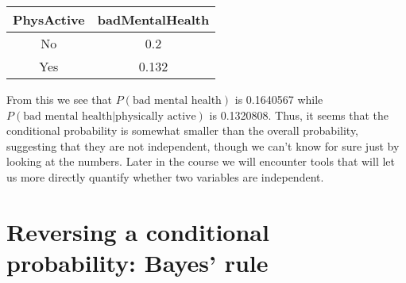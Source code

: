 \documentclass[]{book}
\theoremstyle{definition}
\theoremstyle{definition}
\theoremstyle{definition}
\theoremstyle{remark}
\begin{document}
\begin{longtable}[]{@{}cc@{}}
\toprule
\begin{minipage}[b]{0.17\columnwidth}\centering\strut
PhysActive\strut
\end{minipage} & \begin{minipage}[b]{0.22\columnwidth}\centering\strut
badMentalHealth\strut
\end{minipage}\tabularnewline
\midrule
\endhead
\begin{minipage}[t]{0.17\columnwidth}\centering\strut
No\strut
\end{minipage} & \begin{minipage}[t]{0.22\columnwidth}\centering\strut
0.2\strut
\end{minipage}\tabularnewline
\begin{minipage}[t]{0.17\columnwidth}\centering\strut
Yes\strut
\end{minipage} & \begin{minipage}[t]{0.22\columnwidth}\centering\strut
0.132\strut
\end{minipage}\tabularnewline
\bottomrule
\end{longtable}

From this we see that \(P(\text{bad mental health})\) is 0.1640567 while
\(P(\text{bad mental health|physically active})\) is 0.1320808. Thus, it
seems that the conditional probability is somewhat smaller than the
overall probability, suggesting that they are not independent, though we
can't know for sure just by looking at the numbers. Later in the course
we will encounter tools that will let us more directly quantify whether
two variables are independent.

\section{Reversing a conditional probability: Bayes'
rule}\label{bayestheorem}
\end{document}
